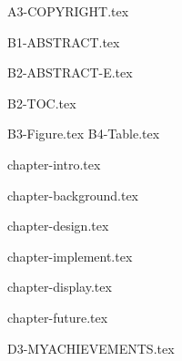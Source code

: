 \documentclass[12pt,openany,a4paper,fancyhdr,twoside]{ctexbook}
\newcommand{\clearPaperPage}{\clearpage}
\newcommand{\eat}[1]{}
\newcommand{\banxiaosi}{\fontsize{13pt}{19.5pt}\selectfont}    %
\newcommand{\xiaosi}{\fontsize{12pt}{18pt}\selectfont}            %
\begin{document}

\clearPaperPage



\clearPaperPage
 {A3-COPYRIGHT.tex}

\clearPaperPage




\clearPaperPage
{}
\pagestyle{plain}



 {B1-ABSTRACT.tex}

\clearPaperPage
 {B2-ABSTRACT-E.tex}
\clearPaperPage



 {B2-TOC.tex}



\clearPaperPage

 {B3-Figure.tex}
\clearPaperPage
 {B4-Table.tex}





\clearPaperPage
{}
\pagestyle{fancy}
\fancyhead[RE,LO]{ \leftmark}








\xiaosi

\clearPaperPage


 {chapter-intro.tex}
\clearPaperPage


 {chapter-background.tex}
\clearPaperPage



\clearPaperPage
 {chapter-design.tex}

\clearPaperPage


 {chapter-implement.tex}
\clearPaperPage

 {chapter-display.tex}

\clearPaperPage


\clearPaperPage

 {chapter-future.tex}

\clearPaperPage
	
	

 \eat{
\clearPaperPage


\fancypagestyle{plain}{%
	\fancyhead[LE,RO]{华东师范大学硕士专业学位论文}
	\fancyhead[RE,LO]{ 致  谢}
}


\addcontentsline{toc}{chapter}{致  谢}

 {D2-ACHNOWLEDGEMENT.tex}
}
\clearPaperPage



 {D3-MYACHIEVEMENTS.tex}
\end{document}

